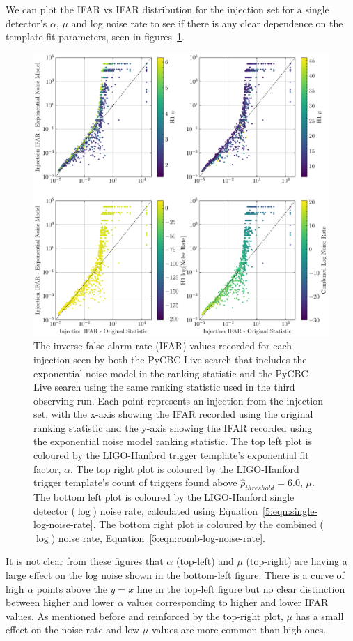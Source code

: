 We can plot the IFAR vs IFAR distribution for the injection set for a single detector's $\alpha$, $\mu$ and log noise rate to see if there is any clear dependence on the template fit parameters, seen in figures~\ref{5:fig:ifar-ifar-subplots}.
%
\begin{figure}
    \centering
    \includegraphics[width=\textwidth]{images/5_pycbclive/plots/fits_only_ifar_vs_ifar_subplots.pdf}
    \caption{The inverse false-alarm rate (IFAR) values recorded for each injection seen by both the PyCBC Live search that includes the exponential noise model in the ranking statistic and the PyCBC Live search using the same ranking statistic used in the third observing run. Each point represents an injection from the injection set, with the x-axis showing the IFAR recorded using the original ranking statistic and the y-axis showing the IFAR recorded using the exponential noise model ranking statistic. The top left plot is coloured by the LIGO-Hanford trigger template's exponential fit factor, $\alpha$. The top right plot is coloured by the LIGO-Hanford trigger template's count of triggers found above $\hat{\rho}_{threshold} = 6.0$, $\mu$. The bottom left plot is coloured by the LIGO-Hanford single detector ($\log$) noise rate, calculated using Equation~\ref{5:eqn:single-log-noise-rate}. The bottom right plot is coloured by the combined ($\log$) noise rate, Equation~\ref{5:eqn:comb-log-noise-rate}.}
    \label{5:fig:ifar-ifar-subplots}
\end{figure}
%
It is not clear from these figures that $\alpha$ (top-left) and $\mu$ (top-right) are having a large effect on the log noise shown in the bottom-left figure. There is a curve of high $\alpha$ points above the $y=x$ line in the top-left figure but no clear distinction between higher and lower $\alpha$ values corresponding to higher and lower IFAR values. As mentioned before and reinforced by the top-right plot, $\mu$ has a small effect on the noise rate and low $\mu$ values are more common than high ones.

